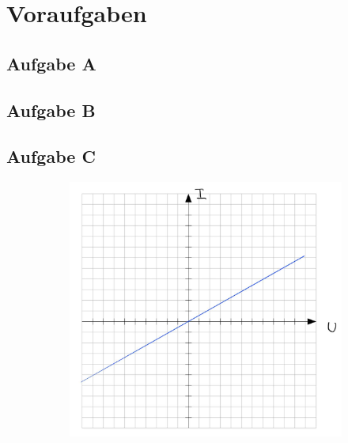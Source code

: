 \section{Voraufgaben}

\subsection*{Aufgabe A}
\subsection*{Aufgabe B}
\subsection*{Aufgabe C}
\begin{figure}[H]
    \centering
    \begin{subfigure}[b]{0.45\textwidth}
        \includegraphics[width=\textwidth]{Voraufgaben/Ca.jpg}
        \caption{}
        \label{fig:VA_C_a}
    \end{subfigure}
    \hfill
    \begin{subfigure}[b]{0.45\textwidth}

\end{subfigure}
\end{figure}
